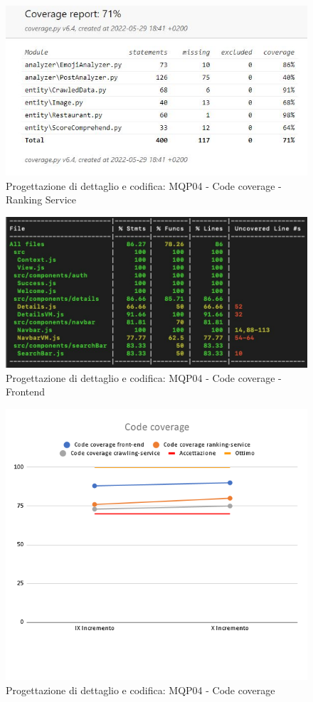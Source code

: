 \begin{figure}[H]
\centering
    \includegraphics[scale=0.70]{Sezioni/images/last_prodotto/coverage-RS.JPG}
    \caption{Progettazione di dettaglio e codifica: MQP04 - Code coverage - Ranking Service}
\end{figure}
\begin{figure}[H]
    \centering
        \includegraphics[scale=0.50]{Sezioni/images/last_prodotto/cov frontend.PNG}
        \caption{Progettazione di dettaglio e codifica: MQP04 - Code coverage - Frontend}
    \end{figure}
\begin{figure}[H]
    \centering
    \includegraphics[scale=0.50]{Sezioni/images/last_prodotto/Code_coverage.png}
    \caption{Progettazione di dettaglio e codifica: MQP04 - Code coverage}
\end{figure}
